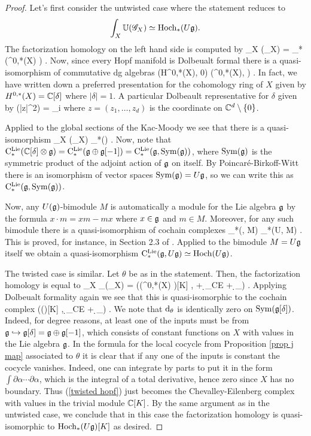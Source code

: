 \begin{proof}
Let's first consider the untwisted case where the statement reduces to $$\int_X \mathbb U (\mathscr G_X) \simeq {\rm Hoch}_*(U \mathfrak g).$$
The factorization homology on the left hand side is computed by
\ben
\int_X \UU(\sG_X) = \clieu_*(\Omega^{0,*}(X) \tensor \fg) .
\een
Now, since every Hopf manifold is Dolbeualt formal there is a quasi-isomorphism of commutative dg algebras
\ben
\left(H^{0,*}(X), 0\right) \simeq \left(\Omega^{0,*}(X), \dbar\right) .
\een
In fact, we have written down a preferred presentation for the cohomology ring of $X$ given by $H^{0,*}(X) = \mathbb C[\delta]$ where $|\delta| = 1$.
A particular Dolbeault representative for $\delta$ given by
\ben
\dbar (\log |z|^2) = \sum_i 
\een
where $z = (z_1,\ldots,z_d)$ is the coordinate on $\mathbb C^d \setminus \{0\}$. 

Applied to the global sections of the Kac-Moody we see that there is a quasi-isomorphism
\ben
\int_X \UU(\sG_X) \simeq \clieu_*(\CC[\delta] \tensor \fg) .
\een
Now, note that ${\rm C}^{\rm Lie}_*(\mathbb C[\delta] \otimes \mathfrak g) = {\rm C}^{\rm Lie}_*(\mathfrak g \oplus \mathfrak g[-1]) = {\rm C}^{\rm Lie}_*(\mathfrak g, {\rm Sym} (\mathfrak g))$, where ${\rm Sym}(\mathfrak g)$ is the symmetric product of the adjoint action of $\mathfrak g$ on itself. 
By Poincar\'{e}-Birkoff-Witt there is an isomorphism of vector spaces ${\rm Sym}(\mathfrak g) = U \mathfrak g$, so we can write this as ${\rm C}^{\rm Lie}_*(\mathfrak g, {\rm Sym} (\mathfrak g))$.

Now, any $U(\mathfrak g)$-bimodule $M$ is automatically a module for the Lie algebra $\mathfrak g$ by the formula $x \cdot m = xm - mx$ where $x \in \mathfrak g$ and $m \in M$.
Moreover, for any such bimodule there is a quasi-isomorphism of cochain complexes 
\ben
\clieu_*(\fg, M) _*(U\fg, M) .
\een
This is proved, for instance, in Section 2.3 of \cite{lectETH}.
Applied to the bimodule $M = U\mathfrak g$ itself we obtain a quasi-isomorphism ${\rm C}^{\rm Lie}_*(\mathfrak g , U\mathfrak g) \simeq {\rm Hoch}(U\mathfrak g)$.

The twisted case is similar. 
Let $\theta$ be as in the statement.
Then, the factorization homology is equal to
\ben
\int_X \UU_\theta (\sG_X) = \left(\Sym(\Omega^{0,*}(X) \tensor \fg)[K] , \dbar + \d_{CE} + \d_\theta\right) .
\een
Applying Dolbeualt formality again we see that this is quasi-isomorphic to the cochain complex
\be\label{twisted hopf}
\left(\Sym(\fg[\delta])[K] ,  \d_{CE} + \d_\theta \right) .
\ee
We note that ${\rm d}_\theta$ is identically zero on ${\rm Sym}(\mathfrak g[\delta])$. 
Indeed, for degree reasons, at least one of the inputs must be from $\mathfrak g \hookrightarrow \mathfrak g[\delta] = \mathfrak g \oplus \mathfrak g[-1]$, which consists of constant functions on $X$ with values in the Lie algebra $\mathfrak g$. 
In the formula for the local cocycle from Proposition \ref{prop j map} associated to $\theta$ it is clear that if any one of the inputs is constant the cocycle vanishes. 
Indeed, one can integrate by parts to put it in the form $\int \partial \alpha \cdots \partial \alpha$, which is the integral of a total derivative, hence zero since $X$ has no boundary.
Thus (\ref{twisted hopf}) just becomes the Chevalley-Eilenberg complex with values in the trivial module $\mathbb C[K]$. 
By the same argument as in the untwisted case, we conclude that in this case the factorization homology is quasi-isomorphic to ${\rm Hoch}_*(U \mathfrak g)[K]$ as desired.
\end{proof}

